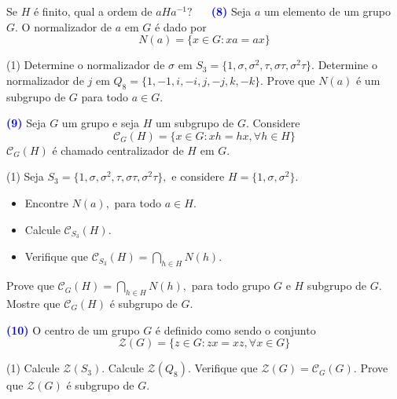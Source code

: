 \documentclass[12pt, a4paper]{article}
\newcommand{\negrito}[1]{\mbox{\boldmath{$#1$}}}
\begin{document}
Se $H$ é finito, qual a ordem de $aHa^{-1}?$
\textcolor{white}{Oi}\newline\newline
\textcolor{blue}{\bf(8)}\label{16} Seja $a$ um elemento de um grupo $G.$ O normalizador de $a$ em $G$ é dado por
\[
N(a) = \{ x \in G : xa = ax \}
\]
\begin{tasks}[counter-format={(tsk[a])},label-width=3.6ex, label-format = {\bfseries}, column-sep = {0pt}](1)
\task[\textcolor{Floresta}{$\negrito{(a)} $}] Determine o normalizador de $\sigma$ em $S_3 = \{1, \sigma, \sigma^2, \tau, \sigma \tau, \sigma^2 \tau \}.$
\task[\textcolor{Floresta}{$\negrito{(b)} $}] Determine o normalizador de $j$ em $Q_8 = \{1, -1, i, -i, j, -j, k,-k \}.$
\task[\textcolor{Floresta}{$\negrito{(c)} $}] Prove que $N(a)$ é um subgrupo de $G$ para todo $a \in G.$
\end{tasks}
\textcolor{blue}{\bf(9)}\label{17} Seja $G$ um grupo e seja $H$ um subgrupo de $G.$ Considere
\[
\mathcal{C}_G(H) = \{x \in G : xh = hx, \forall h \in H \}
\]
$\mathcal{C}_G(H)$ é chamado centralizador de $H$ em $G.$
\begin{tasks}[counter-format={(tsk[a])},label-width=3.6ex, label-format = {\bfseries}, column-sep = {0pt}](1)
\task[\textcolor{Floresta}{$\negrito{(a)} $}] Seja $S_3 = \{1, \sigma, \sigma^2, \tau, \sigma \tau, \sigma^2 \tau \},$ e considere $H = \{1, \sigma, \sigma^2 \}.$ 
\begin{itemize}
\item Encontre $N(a),$ para todo $a \in H.$
\item Calcule $\mathcal{C}_{S_3}(H).$
\item Verifique que $\mathcal{C}_{S_3}(H) = \bigcap\limits_{h \in H} N(h).$
\end{itemize}
\task[\textcolor{Floresta}{$\negrito{(b)} $}] Prove que $\mathcal{C}_{G}(H) = \bigcap\limits_{h \in H} N(h),$ para todo grupo $G$ e $H$ subgrupo de $G.$
\task[\textcolor{Floresta}{$\negrito{(c)} $}] Mostre que $\mathcal{C}_G(H)$ é subgrupo de $G.$
\end{tasks}
\textcolor{blue}{\bf(10)}\label{18} O centro de um grupo $G$ é definido como sendo o conjunto
\[
\mathcal{Z}(G) = \{ z \in G : zx = xz, \forall x \in G \}
\]
\begin{tasks}[counter-format={(tsk[a])},label-width=3.6ex, label-format = {\bfseries}, column-sep = {0pt}](1)
\task[\textcolor{Floresta}{$\negrito{(a)} $}] Calcule $\mathcal{Z}(S_3).$
\task[\textcolor{Floresta}{$\negrito{(b)} $}] Calcule $\mathcal{Z}(Q_8).$
\task[\textcolor{Floresta}{$\negrito{(c)} $}] Verifique que $\mathcal{Z}(G) = \mathcal{C}_G(G).$
\task[\textcolor{Floresta}{$\negrito{(d)} $}] Prove que $\mathcal{Z}(G)$ é subgrupo de $G.$
\end{tasks}
\end{document}
